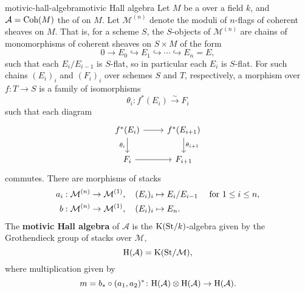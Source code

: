 \begin{topic}{motivic-hall-algebra}{motivic Hall algebra}
    Let $M$ be a   over a field $k$, and $\mathcal{A} = \textup{Coh}(M)$ the  of  on $M$. Let $\mathcal{M}^{(n)}$ denote the moduli  of $n$-flags of coherent sheaves on $M$. That is, for a scheme $S$, the $S$-objects of $\mathcal{M}^{(n)}$ are chains of monomorphisms of coherent sheaves on $S \times M$ of the form
    \[ 0 \to E_0 \hookrightarrow E_1 \hookrightarrow \cdots \hookrightarrow E_n = E , \]
    such that each $E_i/E_{i - 1}$ is $S$-flat, so in particular each $E_i$ is $S$-flat. For such chains $(E_i)_i$ and $(F_i)_i$ over schemes $S$ and $T$, respectively, a morphism over $f \colon T \to S$ is a family of isomorphisms
    \[ \theta_i \colon f^*(E_i) \xrightarrow{\sim} F_i \]
    such that each diagram
    \[ \svg \begin{tikzcd} f^*(E_i) \arrow[swap]{d}{\theta_i} \arrow{r} & f^*(E_{i + 1}) \arrow{d}{\theta_{i + 1}} \\ F_i \arrow{r} & F_{i + 1} \end{tikzcd} \]
    commutes.
    There are morphisms of stacks
    \[ \begin{aligned}
        a_i &: \mathcal{M}^{(n)} \to \mathcal{M}^{(1)}, \quad (E_i)_i \mapsto E_i/E_{i - 1} \quad \textup{ for } 1 \le i \le n , \\
        b &: \mathcal{M}^{(n)} \to \mathcal{M}^{(1)}, \quad (E_i)_i \mapsto E_n .
    \end{aligned} \]
    The \textbf{motivic Hall algebra} of $\mathcal{A}$ is the $\textup{K}(\textup{St}/k)$-algebra given by the Grothendieck group of stacks over $\mathcal{M}$,
    \[ \textup{H}(\mathcal{A}) = \textup{K}(\textup{St}/\mathcal{M}) , \]
    where multiplication given by
    \[ m = b_* \circ (a_1, a_2)^* \colon \textup{H}(\mathcal{A}) \otimes \textup{H}(\mathcal{A}) \to \textup{H}(\mathcal{A}) . \]
\end{topic}

